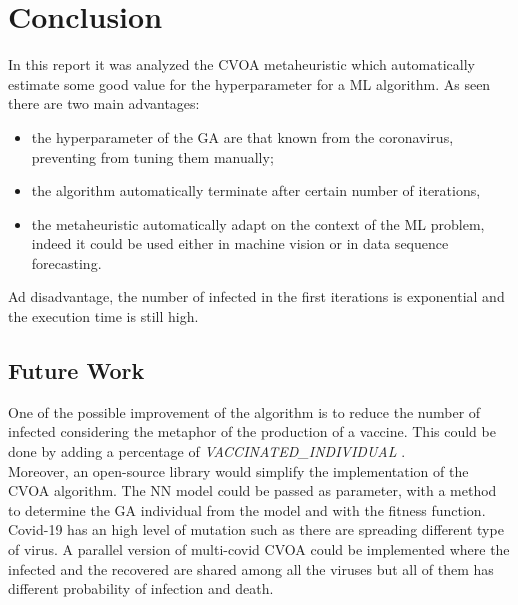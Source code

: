 \documentclass[letterpaper]{article}%
\begin{document}
\section{Conclusion}
In this report it was analyzed the CVOA metaheuristic which automatically estimate some good value for the hyperparameter for a ML algorithm. As seen there are two main advantages:
\begin{itemize}
	\item the hyperparameter of the GA are that known from the coronavirus, preventing from tuning them manually;
	\item the algorithm automatically terminate after certain number of iterations,
	\item the metaheuristic automatically adapt on the context of the ML problem, indeed it could be used either in machine vision or in data sequence forecasting.
\end{itemize}
Ad disadvantage, the number of infected in the first iterations is exponential and the execution time is still high.

\subsection{Future Work}
One of the possible improvement of the algorithm is to reduce the number of infected considering the metaphor of the production of a vaccine. This could be done by adding a percentage of  \textit{VACCINATED\_INDIVIDUAL} .\\
Moreover, an open-source library would simplify the implementation of the CVOA algorithm. The NN model could be passed as parameter, with a method to determine the GA individual from the model and with the fitness function.\\
Covid-19 has an high level of mutation such as there are spreading different type of virus. A parallel version of multi-covid CVOA could be implemented where the infected and the recovered are shared among all the viruses but all of them has different probability of infection and death. 
\clearpage
\onecolumn
\end{document}
